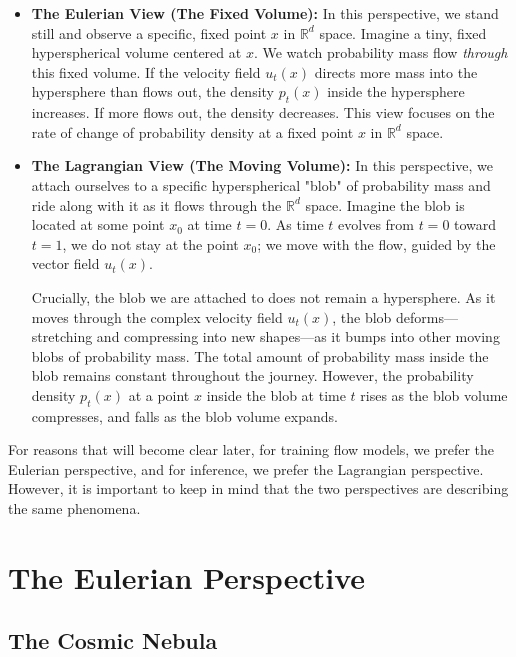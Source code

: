 \documentclass{book}
\begin{document}
\begin{itemize}
    \item \textbf{The Eulerian View (The Fixed Volume):}
    In this perspective, we stand still and observe a specific, fixed point $x$ in $\mathbb{R}^d$ space. Imagine a tiny, fixed hyperspherical volume centered at $x$. We watch probability mass flow \textit{through} this fixed volume.
    If the velocity field $u_t(x)$ directs more mass into the hypersphere than flows out, the density $p_t(x)$ inside the hypersphere increases. If more flows out, the density decreases. This view focuses on the rate of change of probability density at a fixed point $x$ in $\mathbb{R}^d$ space.

    \item \textbf{The Lagrangian View (The Moving Volume):}
    In this perspective, we attach ourselves to a specific hyperspherical "blob" of probability mass and ride along with it as it flows through the $\mathbb{R}^d$ space. Imagine the blob is located at some point $x_0$ at time $t=0$. As time $t$ evolves from $t=0$ toward $t=1$, we do not stay at the point $x_0$; we move with the flow, guided by the vector field $u_t(x)$.

    
    Crucially, the blob we are attached to does not remain a hypersphere. As it moves through the complex velocity field $u_t(x)$, the blob deforms—stretching and compressing into new shapes—as it bumps into other moving blobs of probability mass. The total amount of probability mass inside the blob remains constant throughout the journey. However, the probability density $p_t(x)$ at a point $x$ inside the blob at time $t$ rises as the blob volume compresses, and falls as the blob volume expands.
\end{itemize}

For reasons that will become clear later, for training flow models, we prefer the Eulerian perspective, and for inference, we prefer the Lagrangian perspective. However, it is important to keep in mind that the two perspectives are describing the same phenomena.

\section{The Eulerian Perspective}

\subsection{The Cosmic Nebula}
\end{document}
